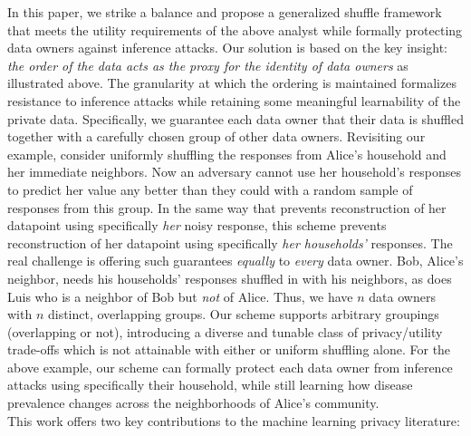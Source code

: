 In this paper, we strike a balance and propose a generalized shuffle framework that meets the utility requirements of the above analyst while formally protecting data owners against inference attacks. 
Our solution is based on the key insight: \textit{the order of the data acts as the proxy for the identity of data owners} as illustrated above. The granularity at which the ordering is maintained formalizes resistance to inference attacks while retaining some meaningful learnability of the private data. Specifically, we guarantee each data owner that their data is shuffled together with a carefully chosen group of other data owners. Revisiting our example, consider uniformly shuffling the responses from Alice's household and her immediate neighbors. Now an adversary cannot use her household's responses to predict her value any better than they could with a random sample of responses from this group. 
In the same way that \ldp prevents reconstruction of her datapoint using specifically \emph{her} noisy response, this scheme prevents reconstruction of her datapoint using specifically \emph{her households'} responses. The real challenge is offering such guarantees \textit{equally} to \textit{every} data owner. Bob, Alice's neighbor, needs his households' responses shuffled in with his neighbors, as does Luis who is a neighbor of Bob but \textit{not} of Alice. Thus, we have $n$ data owners with $n$ distinct, overlapping groups. Our scheme supports arbitrary groupings (overlapping or not), introducing a diverse and tunable class of privacy/utility trade-offs which is not attainable with either \ldp or uniform shuffling alone.
For the above example, our scheme can formally protect each data owner from inference attacks using specifically their household, while still learning how disease prevalence changes across the neighborhoods of Alice's community.\\
This work offers two key contributions to the machine learning privacy literature: 
 \vspace{-0.2cm}
\squishlistfour
